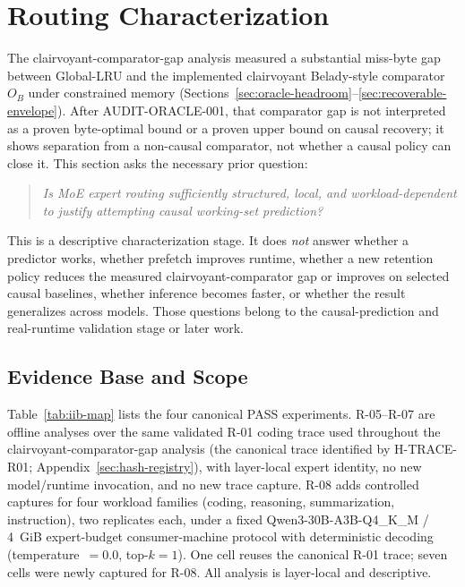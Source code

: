 \section{Routing Characterization}
\label{sec:iib}

The clairvoyant-comparator-gap analysis measured a substantial miss-byte gap between Global-LRU
and the implemented clairvoyant Belady-style comparator $O_B$ under
constrained memory (Sections~\ref{sec:oracle-headroom}--\ref{sec:recoverable-envelope}).
After \textsc{AUDIT-ORACLE-001}, that comparator gap is not interpreted as a
proven byte-optimal bound or a proven upper bound on causal recovery; it
shows separation from a non-causal comparator, not whether a causal policy
can close it. This section asks the necessary prior question:

\begin{quote}
\emph{Is MoE expert routing sufficiently structured, local, and
workload-dependent to justify attempting causal working-set prediction?}
\end{quote}

This is a descriptive characterization stage. It does \emph{not}
answer whether a predictor works, whether prefetch improves runtime,
whether a new retention policy reduces the measured clairvoyant-comparator
gap or improves on selected causal baselines, whether inference
becomes faster, or whether the result generalizes across models. Those
questions belong to the causal-prediction and real-runtime validation
stage or later work.

\subsection{Evidence Base and Scope}
\label{sec:iib-scope}

Table~\ref{tab:iib-map} lists the four canonical PASS experiments.
R-05--R-07 are offline analyses over the same validated R-01 coding
trace used throughout the clairvoyant-comparator-gap analysis
(the canonical trace identified by H-TRACE-R01; Appendix~\ref{sec:hash-registry}),
with layer-local expert identity, no new model/runtime invocation, and no
new trace capture. R-08 adds controlled captures for four workload
families (coding, reasoning, summarization, instruction), two replicates
each, under a fixed Qwen3-30B-A3B-Q4\_K\_M / 4~GiB expert-budget
consumer-machine protocol with deterministic decoding
(temperature~$=0.0$, top-$k=1$). One  cell reuses the
canonical R-01 trace; seven cells were newly captured for R-08. All
analysis is layer-local and descriptive.

